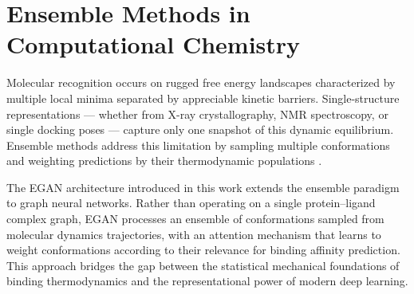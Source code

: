 \section{Ensemble Methods in Computational Chemistry}

Molecular recognition occurs on rugged free energy landscapes characterized by multiple local minima separated by appreciable kinetic barriers. Single-structure representations --- whether from X-ray crystallography, NMR spectroscopy, or single docking poses --- capture only one snapshot of this dynamic equilibrium. Ensemble methods address this limitation by sampling multiple conformations and weighting predictions by their thermodynamic populations \cite{Amaro2018}.

The EGAN architecture introduced in this work extends the ensemble paradigm to graph neural networks. Rather than operating on a single protein--ligand complex graph, EGAN processes an ensemble of conformations sampled from molecular dynamics trajectories, with an attention mechanism that learns to weight conformations according to their relevance for binding affinity prediction. This approach bridges the gap between the statistical mechanical foundations of binding thermodynamics and the representational power of modern deep learning.

